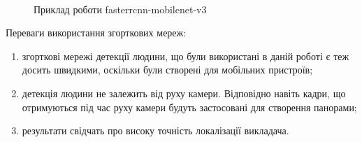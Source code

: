 \begin{figure}[H]
    \centering
    \\
    \caption{Приклад роботи fasterrcnn-mobilenet-v3
        \label{fig:fasterrcnn_examples}
    }
\end{figure}

Переваги використання згорткових мереж:
\begin{enumerate}
    \item згорткові мережі детекції людини, що були використані в даній роботі
          є теж досить швидкими, оскільки були створені для мобільних пристроїв;
    \item детекція людини не залежить від руху камери. Відповідно навіть кадри, що
          отримуються під час руху камери будуть застосовані для створення панорами;
    \item результати свідчать про високу точність локалізації викладача.
\end{enumerate}

